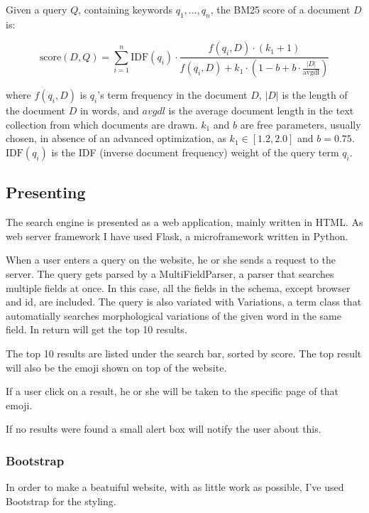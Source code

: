 \documentclass[a4paper]{article}
\begin{document}
Given a query $Q$, containing keywords $q_1, ..., q_n$, the BM25 score of a document $D$ is:

$$\text{score}(D,Q) = \sum_{i=1}^{n} \text{IDF}(q_i) \cdot \frac{f(q_i, D) \cdot (k_1 + 1)}{f(q_i, D) + k_1 \cdot (1 - b + b \cdot \frac{|D|}{\text{avgdl}})}
$$

where $f(q_i, D)$ is $q_i$'s term frequency in the document $D$, $|D|$ is the length of the document $D$ in words, and $avgdl$ is the average document length in the text collection from which documents are drawn. $k_1$ and $b$ are free parameters, usually chosen, in absence of an advanced optimization, as $k_1 \in [1.2,2.0]$ and $b = 0.75$. $\text{IDF}(q_i)$ is the IDF (inverse document frequency) weight of the query term $q_i$. 


\subsection{Presenting} %
\label{sub:presenting}

The search engine is presented as a web application, mainly written in HTML. As web server framework I have used Flask, a microframework written in Python. \cite{ fl}

When a user enters a query on the website, he or she sends a request to the server. The query gets parsed by a MultiFieldParser, a parser that searches multiple fields at once. In this case, all the fields in the schema, except browser and id, are included. The query is also variated with Variations, a term class that automatially searches morphological variations of the given word in the same field. In return will get the top 10 results.

The top 10 results are listed under the search bar, sorted by score. The top result will also be the emoji shown on top of the website.

If a user click on a result, he or she will be taken to the specific page of that emoji.

If no results were found a small alert box will notify the user about this.

\subsubsection{Bootstrap} %
\label{ssub:bootstrap}

In order to make a beatuiful website, with as little work as possible, I've used Bootstrap for the styling. \cite{ boot}
\end{document}
